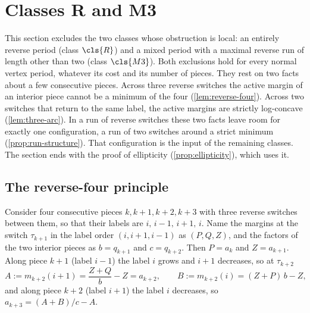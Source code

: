 \section{Classes R and M3}\label{sec:reverse}

This section excludes the two classes whose obstruction is local: an entirely reverse period
(class $\cls{R}$) and a mixed period with a maximal reverse run of length other than two (class
$\cls{M3}$). Both exclusions hold for every normal vertex period, whatever its cost and its
number of pieces. They rest on two facts about a few consecutive pieces. Across three reverse
switches the active margin of an interior piece cannot be a minimum of the four
(\cref{lem:reverse-four}). Across two switches that return to the same label, the active margins
are strictly log-concave (\cref{lem:three-arc}). In a run of reverse switches these two facts
leave room for exactly one configuration, a run of two switches around a strict minimum
(\cref{prop:run-structure}). That configuration is the input of the remaining classes. The
section ends with the proof of ellipticity (\cref{prop:ellipticity}), which uses it.

\subsection{The reverse-four principle}\label{sec:rev-four}

Consider four consecutive pieces $k,k+1,k+2,k+3$ with three reverse switches between them, so
that their labels are $i,\,i-1,\,i+1,\,i$. Name the margins at the switch $\tau_{k+1}$ in the label
order $(i,i+1,i-1)$ as $(P,Q,Z)$, and the factors of the two interior pieces as $b=q_{k+1}$ and
$c=q_{k+2}$. Then $P=a_k$ and $Z=a_{k+1}$. Along piece $k+1$ (label $i-1$) the label $i$ grows and
$i+1$ decreases, so at $\tau_{k+2}$
\[
  A:=m_{k+2}(i+1)=\frac{Z+Q}{b}-Z=a_{k+2},\qquad B:=m_{k+2}(i)=(Z+P)\,b-Z,
\]
and along piece $k+2$ (label $i+1$) the label $i$ decreases, so $a_{k+3}=(A+B)/c-A$.

